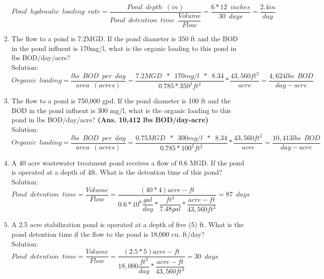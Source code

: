 \begin{enumerate}
$Pond \enspace hydraulic \enspace loading \enspace rate=\dfrac{Pond \enspace depth \enspace (in)}{Pond \enspace detention  \enspace time \enspace \dfrac{Volume}{Flow}}=\dfrac{6*12 \enspace inches}{30 \enspace days}=\boxed{\dfrac{2.4in}{day}}$\\
\vspace{0.25cm}




\item The flow to a pond is 7.2MGD. If the pond diameter is 350 ft and the BOD in the pond influent is 170mg/l, what is the organic loading to this pond in lbs BOD/day/acre?
\\
Solution:\\
$Organic \enspace loading=\dfrac{lbs \enspace BOD \enspace per \enspace day}{area \enspace (acres)}=\dfrac{7.2MGD \enspace * \enspace 170mg/l \enspace * \enspace 8.34}{0.785*350^2ft^2}*\dfrac{43,560ft^2}{acre}=\boxed{\dfrac{4,624lbs \enspace BOD}{day-acre}}$

\item The flow to a pond is 750,000 gpd. If the pond diameter is 100 ft and the BOD in the pond influent is 300 mg/l, what is the organic loading to this pond in lbs BOD/day/acre? \textbf{(Ans. 10,412 lbs BOD/day-acre)}
\\
Solution:\\
$Organic \enspace loading=\dfrac{lbs \enspace BOD \enspace per \enspace day}{area \enspace (acres)}=\dfrac{0.75MGD \enspace * \enspace 300mg/l \enspace * \enspace 8.34}{0.785*100^2ft^2}*\dfrac{43,560ft^2}{acre}=\boxed{\dfrac{10,413lbs \enspace BOD}{day-acre}}$

\item A 40 acre wastewater treatment pond receives a flow of 0.6 MGD. If the pond is operated at a depth of 4ft. What is the detention time of this pond?\\
Solution:\\
$Pond \enspace detention \enspace time=\dfrac{Volume}{Flow}=\dfrac{(40*4)acre-ft}{0.6*10^6\dfrac{gal}{day}*\dfrac{ft^3}{7.48gal}*\dfrac{acre-ft}{43,560ft^3}}=\boxed{87 \enspace days}$\\ 

\item A 2.5 acre stabilization pond is operated at a depth of five (5) ft.  What is the pond detention time if the flow to the pond is 18,000 cu. ft/day?\\
Solution:\\
$Pond \enspace detention \enspace time=\dfrac{Volume}{Flow}=\dfrac{(2.5*5)acre-ft}{18,000\dfrac{ft^3}{day}*\dfrac{acre-ft}{43,560ft^3}}=\boxed{30 \enspace days}$\\ 


\end{enumerate}
